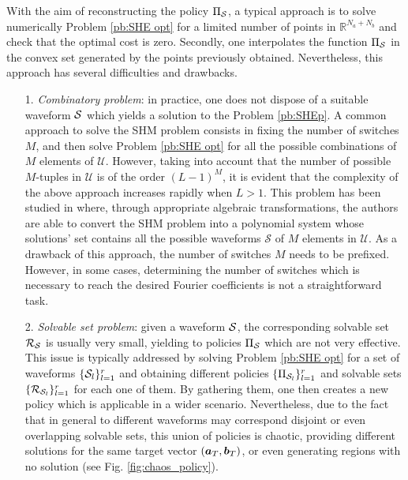 \documentclass[twocolumn]{autart}    %
\begin{document}
With the aim of reconstructing the policy $\Pi_{\mathcal{S}}$, a typical approach is to solve numerically Problem \ref{pb:SHE opt} for a limited number of points in $\mathbb{R}^{N_a+N_b}$ and check that the optimal cost is zero. Secondly, one interpolates the function $\Pi_{\mathcal{S}}$ in the convex set generated by the points previously obtained. Nevertheless, this approach has several difficulties and drawbacks.

\begin{itemize}
	\item[1.] \textit{Combinatory problem}: in practice, one does not dispose of a suitable waveform $\mathcal{S}$ which yields a solution to the Problem \ref{pb:SHEp}. A common approach to solve the SHM problem consists in fixing the number of switches $M$, and then solve Problem \ref{pb:SHE opt} for  all the possible combinations of $M$ elements of $\mathcal{U}$. However, taking into account that the number of possible $M$-tuples  in $\mathcal U$ is of the order $(L-1)^M$, it is evident that the complexity of the above approach increases rapidly when $L>1$. This problem has been studied in \cite{Yang2015} where, through appropriate algebraic transformations, the authors are able to convert the SHM problem into a polynomial system whose solutions' set contains all the possible waveforms $\mathcal S$ of $M$ elements in $\mathcal{U}$. As a drawback of this approach, the number of switches $M$ needs to be prefixed. However, in some cases,  determining the number of switches which is necessary to reach the desired Fourier coefficients is not a straightforward task.
	
	\item[2.] \textit{Solvable set problem}: given a waveform $\mathcal{S}$, the corresponding solvable set $\mathcal{R}_{\mathcal{S}}$ is usually very small, yielding to policies $\Pi_{\mathcal{S}}$ which are not very effective. This issue is typically addressed by solving Problem \ref{pb:SHE opt} for a set of waveforms $\{\mathcal{S}_l\}_{l=1}^r$ and obtaining different policies $\{\Pi_{\mathcal{S}_l}\}_{l=1}^r$ and solvable sets $\{\mathcal{R}_{\mathcal{S}_l}\}_{l=1}^r$ for each one of them. By gathering them, one then creates a new policy which is applicable in a wider scenario. Nevertheless, due to the fact that in general to different waveforms may correspond disjoint or even overlapping solvable sets, this union of policies is chaotic, providing different solutions for the same target vector $(\bm{a}_T,\bm{b}_T)$, or even generating regions with no solution (see Fig. \ref{fig:chaos_policy}).
	

\end{itemize}
\end{document}

